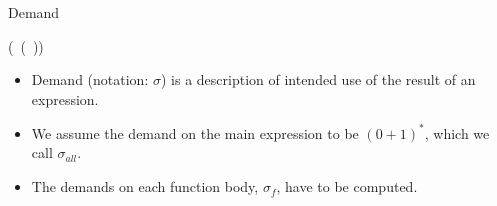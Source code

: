 \documentclass[xcolor=x11names,compress,mathserif]{beamer}
\renewcommand{\(}{\begin{columns}}
\renewcommand{\)}{\end{columns}}
\newcommand{\<}[1]{\begin{column}{#1}}
\renewcommand{\>}{\end{column}}
\begin{document}
\begin{frame}{Demand}
  \begin{center}
     (\CAR\ (\CDR\ \pw)) \\
  \end{center}
  \pause
\centerline{}
  \begin{itemize}
  \item Demand  (notation: $\sigma$) is a description  of intended use
    of the result of an expression.
   \pause
\item We assume the demand on the main expression to be $(0+1)^*$,
  which we call $\sigma_{all}$.
\item The demands on each function body, $\sigma_f$, have to be computed.
  \end{itemize}
\end{frame}

\end{document}
